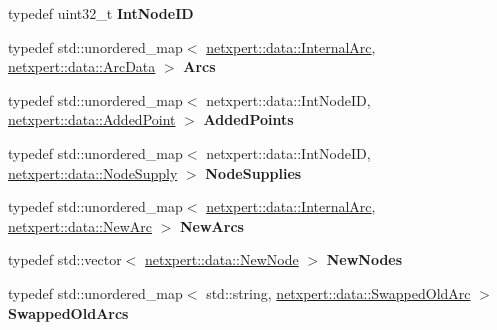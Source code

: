 \begin{DoxyCompactItemize}
\item 
typedef uint32\+\_\+t {\bfseries Int\+Node\+ID}\hypertarget{namespacenetxpert_1_1data_a36fb32c557292b103d2bf46bbc2cd882}{}\label{namespacenetxpert_1_1data_a36fb32c557292b103d2bf46bbc2cd882}

\item 
typedef std\+::unordered\+\_\+map$<$ \hyperlink{structnetxpert_1_1data_1_1InternalArc}{netxpert\+::data\+::\+Internal\+Arc}, \hyperlink{structnetxpert_1_1data_1_1ArcData}{netxpert\+::data\+::\+Arc\+Data} $>$ {\bfseries Arcs}\hypertarget{namespacenetxpert_1_1data_a6307cf3ae511c5de2391b46f928e66cd}{}\label{namespacenetxpert_1_1data_a6307cf3ae511c5de2391b46f928e66cd}

\item 
typedef std\+::unordered\+\_\+map$<$ netxpert\+::data\+::\+Int\+Node\+ID, \hyperlink{structnetxpert_1_1data_1_1AddedPoint}{netxpert\+::data\+::\+Added\+Point} $>$ {\bfseries Added\+Points}\hypertarget{namespacenetxpert_1_1data_add459e1853d5e9567a809f92c6e874ec}{}\label{namespacenetxpert_1_1data_add459e1853d5e9567a809f92c6e874ec}

\item 
typedef std\+::unordered\+\_\+map$<$ netxpert\+::data\+::\+Int\+Node\+ID, \hyperlink{structnetxpert_1_1data_1_1NodeSupply}{netxpert\+::data\+::\+Node\+Supply} $>$ {\bfseries Node\+Supplies}\hypertarget{namespacenetxpert_1_1data_a5936ebac3d50af64fa570da25db0dbdd}{}\label{namespacenetxpert_1_1data_a5936ebac3d50af64fa570da25db0dbdd}

\item 
typedef std\+::unordered\+\_\+map$<$ \hyperlink{structnetxpert_1_1data_1_1InternalArc}{netxpert\+::data\+::\+Internal\+Arc}, \hyperlink{structnetxpert_1_1data_1_1NewArc}{netxpert\+::data\+::\+New\+Arc} $>$ {\bfseries New\+Arcs}\hypertarget{namespacenetxpert_1_1data_abc88bcfe1a3101fbf6ba909f54ab458e}{}\label{namespacenetxpert_1_1data_abc88bcfe1a3101fbf6ba909f54ab458e}

\item 
typedef std\+::vector$<$ \hyperlink{structnetxpert_1_1data_1_1NewNode}{netxpert\+::data\+::\+New\+Node} $>$ {\bfseries New\+Nodes}\hypertarget{namespacenetxpert_1_1data_a6c710e3aa7252a045619ab5bc807d60e}{}\label{namespacenetxpert_1_1data_a6c710e3aa7252a045619ab5bc807d60e}

\item 
typedef std\+::unordered\+\_\+map$<$ std\+::string, \hyperlink{structnetxpert_1_1data_1_1SwappedOldArc}{netxpert\+::data\+::\+Swapped\+Old\+Arc} $>$ {\bfseries Swapped\+Old\+Arcs}\hypertarget{namespacenetxpert_1_1data_a1feaf68ed3b4085f21c66e549e4b97ae}{}\label{namespacenetxpert_1_1data_a1feaf68ed3b4085f21c66e549e4b97ae}


\end{DoxyCompactItemize}
